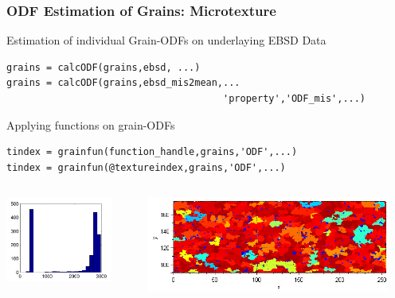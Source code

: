 \begin{frame}[fragile]
  \frametitle{ODF Estimation of Grains: Microtexture}

Estimation of individual Grain-ODFs on underlaying EBSD Data
\begin{lstlisting}
grains = calcODF(grains,ebsd, ...)
grains = calcODF(grains,ebsd_mis2mean,...
									  'property','ODF_mis',...)
\end{lstlisting}

Applying functions on grain-ODFs
\begin{lstlisting}
tindex = grainfun(function_handle,grains,'ODF',...)
tindex = grainfun(@textureindex,grains,'ODF',...)
\end{lstlisting}

\begin{columns}
\begin{column}[T]{3.5cm}
\includegraphics[width=3.5cm]{pic/grtindxhist}
\end{column}
\begin{column}[T]{8cm}
\includegraphics[width=8cm]{pic/grtindx}
\end{column}
\end{columns}

\end{frame}



